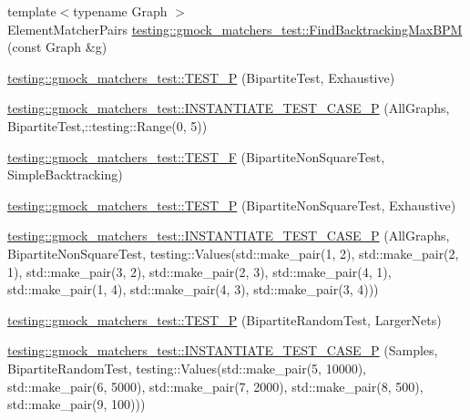 \begin{DoxyCompactItemize}
\item 
{\footnotesize template$<$typename Graph $>$ }\\Element\+Matcher\+Pairs \hyperlink{namespacetesting_1_1gmock__matchers__test_a09321a8d4a4c40ab1e369fbdf92b0414}{testing\+::gmock\+\_\+matchers\+\_\+test\+::\+Find\+Backtracking\+Max\+B\+PM} (const Graph \&g)
\item 
\hyperlink{namespacetesting_1_1gmock__matchers__test_a20589d957fcfe5399e249084dbc23e82}{testing\+::gmock\+\_\+matchers\+\_\+test\+::\+T\+E\+S\+T\+\_\+P} (Bipartite\+Test, Exhaustive)
\item 
\hyperlink{namespacetesting_1_1gmock__matchers__test_a3ca71a91f2b60ab08922acb7da0f8df0}{testing\+::gmock\+\_\+matchers\+\_\+test\+::\+I\+N\+S\+T\+A\+N\+T\+I\+A\+T\+E\+\_\+\+T\+E\+S\+T\+\_\+\+C\+A\+S\+E\+\_\+P} (All\+Graphs, Bipartite\+Test,\+::testing\+::\+Range(0, 5))
\item 
\hyperlink{namespacetesting_1_1gmock__matchers__test_a7d2395b1cb6a90bdc8d46ae06f99f6c7}{testing\+::gmock\+\_\+matchers\+\_\+test\+::\+T\+E\+S\+T\+\_\+F} (Bipartite\+Non\+Square\+Test, Simple\+Backtracking)
\item 
\hyperlink{namespacetesting_1_1gmock__matchers__test_a3ac913ed55a7ac2636ae7bfce04296e9}{testing\+::gmock\+\_\+matchers\+\_\+test\+::\+T\+E\+S\+T\+\_\+P} (Bipartite\+Non\+Square\+Test, Exhaustive)
\item 
\hyperlink{namespacetesting_1_1gmock__matchers__test_a64ef722e930c3088ddea704ac20194b5}{testing\+::gmock\+\_\+matchers\+\_\+test\+::\+I\+N\+S\+T\+A\+N\+T\+I\+A\+T\+E\+\_\+\+T\+E\+S\+T\+\_\+\+C\+A\+S\+E\+\_\+P} (All\+Graphs, Bipartite\+Non\+Square\+Test, testing\+::\+Values(std\+::make\+\_\+pair(1, 2), std\+::make\+\_\+pair(2, 1), std\+::make\+\_\+pair(3, 2), std\+::make\+\_\+pair(2, 3), std\+::make\+\_\+pair(4, 1), std\+::make\+\_\+pair(1, 4), std\+::make\+\_\+pair(4, 3), std\+::make\+\_\+pair(3, 4)))
\item 
\hyperlink{namespacetesting_1_1gmock__matchers__test_ace6351a5a34b746491458140b06534ed}{testing\+::gmock\+\_\+matchers\+\_\+test\+::\+T\+E\+S\+T\+\_\+P} (Bipartite\+Random\+Test, Larger\+Nets)
\item 
\hyperlink{namespacetesting_1_1gmock__matchers__test_a857f48ffb1fc6f5ce61aec79b5c94da8}{testing\+::gmock\+\_\+matchers\+\_\+test\+::\+I\+N\+S\+T\+A\+N\+T\+I\+A\+T\+E\+\_\+\+T\+E\+S\+T\+\_\+\+C\+A\+S\+E\+\_\+P} (Samples, Bipartite\+Random\+Test, testing\+::\+Values(std\+::make\+\_\+pair(5, 10000), std\+::make\+\_\+pair(6, 5000), std\+::make\+\_\+pair(7, 2000), std\+::make\+\_\+pair(8, 500), std\+::make\+\_\+pair(9, 100)))

\end{DoxyCompactItemize}
